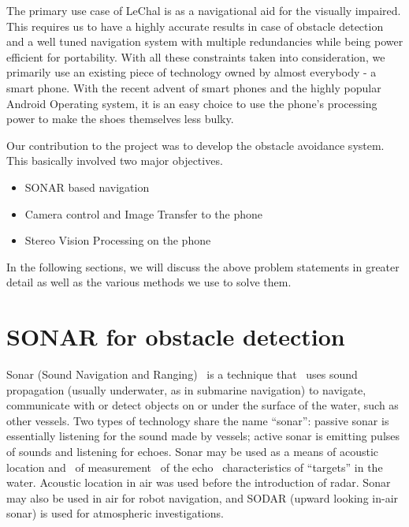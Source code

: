 \documentclass[11pt]{report}
\begin{document}
{The primary use case of LeChal is as a navigational aid for the visually impaired. This requires us to have a highly accurate results in case of obstacle detection and a well tuned navigation system with multiple redundancies while being power efficient for portability. With all these constraints taken into consideration, we primarily use an existing piece of technology owned by almost everybody - a smart phone. With the recent advent of smart phones and the highly popular Android Operating system, it is an easy choice to use the phone's processing power to make the shoes themselves less bulky.

Our contribution to the project was to develop the obstacle avoidance system. This basically involved two major objectives.

\begin{itemize}
\item SONAR based navigation
\item Camera control and Image Transfer to the phone
\item Stereo Vision Processing on the phone
\end{itemize}        

In the following sections, we will discuss the above problem statements in greater detail as well as the various methods we use to solve them.
\section{SONAR for obstacle detection}
Sonar (Sound Navigation and Ranging) \ is a technique that \ uses sound
propagation (usually underwater, as in submarine navigation) to
navigate, communicate with or detect objects on or under the surface of
the water, such as other vessels. Two types of technology share the
name {\textquotedblleft}sonar{\textquotedblright}: passive sonar is
essentially listening for the sound made by vessels; active sonar is
emitting pulses of sounds and listening for echoes. Sonar may be used
as a means of acoustic location and \ of measurement \ of the echo
\ characteristics of {\textquotedblleft}targets{\textquotedblright} in
the water. Acoustic location in air was used before the introduction of
radar. Sonar may also be used in air for robot navigation, and SODAR
(upward looking in{}-air sonar) is used for atmospheric
investigations.}


\bigskip
\end{document}
